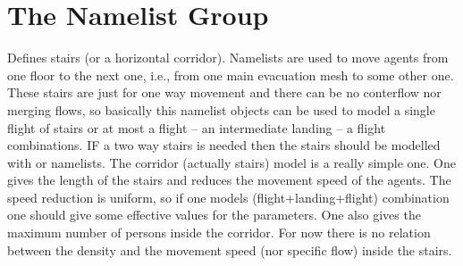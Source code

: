 \documentclass[12pt,a4paper,final,twoside]{stylevk}
\begin{document}
\section{The  Namelist Group}\label{Sec_CorrNML}

\noindent Defines stairs (or a horizontal corridor).  Namelists
 are used to move agents from one floor to the next one,
i.e., from one main evacuation mesh to some other one.  These
stairs are just for one way movement and there can be no conterflow
nor merging flows, so basically this namelist objects can be used to
model a single flight of stairs or at most a flight -- an intermediate
landing -- a flight combinations.  IF a two way stairs is needed then
the stairs should be modelled with  or 
namelists.  The corridor (actually stairs)
model is a really simple one.  One gives the length of the stairs and
reduces the movement speed of the agents.  The speed reduction is
uniform, so if one models (flight+landing+flight) combination one
should give some effective values for the parameters.  One also gives
the maximum number of persons inside the corridor.  For now there is
no relation between the density and the movement speed (nor specific
flow) inside the stairs.
\end{document}
